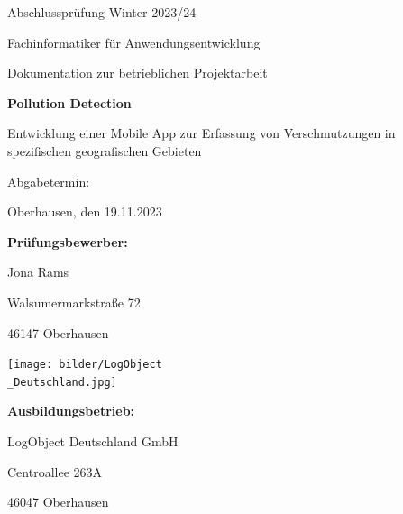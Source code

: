 \documentclass[a4paper,12pt]{article}
\begin{document}
\begin{titlepage}
    \centering
    \par\vspace{1cm}
    {\large Abschlussprüfung Winter 2023/24 \par}
    \vspace{0.5cm}
    {\Large Fachinformatiker für Anwendungsentwicklung\par}
    \vspace{0.5cm}
    {\LARGE Dokumentation zur betrieblichen Projektarbeit\par}
    \vspace{2cm}
    {\huge\bfseries Pollution Detection \par}
    \vspace{0.5cm}
    {\Large Entwicklung einer Mobile App zur Erfassung von Verschmutzungen in spezifischen geografischen Gebieten \par}
     \vspace{1cm}
    Abgabetermin: \par
    Oberhausen, den 19.11.2023

    \vspace{1.5cm}

    {\bfseries Prüfungsbewerber: \par}
    Jona Rams \par
    Walsumermarkstraße 72 \par
    46147 Oberhausen

    \vspace{0.5cm}
    \texttt{[image: bilder/LogObject\\\_Deutschland.jpg]} %

     \vspace{0.5cm}

   {\bfseries Ausbildungsbetrieb: \par}
    LogObject Deutschland GmbH \par
    Centroallee 263A \par
    46047 Oberhausen

\end{titlepage}

\clearpage
\tableofcontents %

\clearpage
\listoffigures
{}

\listoftables
{}
\end{document}

